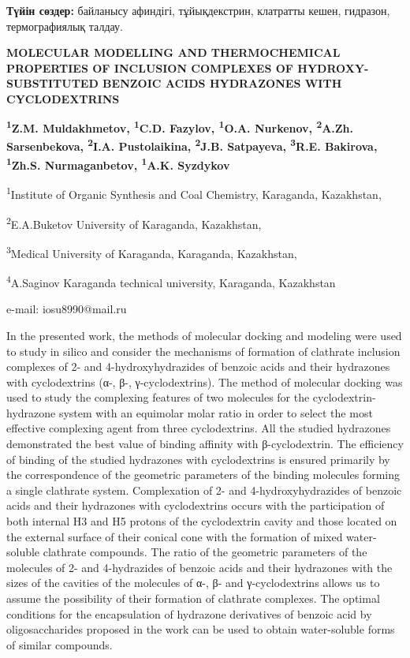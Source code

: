 {\bfseries Түйін сөздер:} байланысу афиндігі, тұйықдекстрин, клатратты
кешен, гидразон, термографиялық талдау.

\begin{articleheader}
{\bfseries MOLECULAR MODELLING AND THERMOCHEMICAL PROPERTIES OF INCLUSION COMPLEXES OF HYDROXY-SUBSTITUTED BENZOIC ACIDS HYDRAZONES WITH CYCLODEXTRINS}

{\bfseries
\textsuperscript{1}Z.M. Muldakhmetov,
\textsuperscript{1}C.D. Fazylov\textsuperscript{\envelope },
\textsuperscript{1}O.A. Nurkenov,
\textsuperscript{2}A.Zh. Sarsenbekova,
\textsuperscript{2}I.A. Pustolaikina,
\textsuperscript{2}J.B. Satpayeva,
\textsuperscript{3}R.E. Bakirova,
\textsuperscript{1}Zh.S. Nurmaganbetov,
\textsuperscript{1}A.K. Syzdykov
}
\end{articleheader}

\begin{affiliation}
\textsuperscript{1}Institute of Organic Synthesis and Coal Chemistry, Karaganda, Kazakhstan,

\textsuperscript{2}E.A.Buketov University of Karaganda, Kazakhstan,

\textsuperscript{3}Medical University of Karaganda, Karaganda, Kazakhstan,

\textsuperscript{4}A.Saginov Karaganda technical university, Karaganda, Kazakhstan

e-mail: iosu8990@mail.ru
\end{affiliation}

In the presented work, the methods of molecular docking and modeling
were used to study in silico and consider the mechanisms of formation of
clathrate inclusion complexes of 2- and 4-hydroxyhydrazides of benzoic
acids and their hydrazones with cyclodextrins (α-, β-, γ-cyclodextrins).
The method of molecular docking was used to study the complexing
features of two molecules for the cyclodextrin-hydrazone system with an
equimolar molar ratio in order to select the most effective complexing
agent from three cyclodextrins. All the studied hydrazones demonstrated
the best value of binding affinity with β-cyclodex\-trin. The efficiency
of binding of the studied hydrazones with cyclodextrins is ensured
primarily by the correspondence of the geometric parameters of the
binding molecules forming a single clathrate system. Complexation of 2-
and 4-hydroxyhydrazides of benzoic acids and their hydrazones with
cyclodextrins occurs with the participation of both internal H3 and H5
protons of the cyclodextrin cavity and those located on the external
surface of their conical cone with the formation of mixed water-soluble
clathrate compounds. The ratio of the geometric parameters of the
molecules of 2- and 4-hydrazides of benzoic acids and their hydrazones
with the sizes of the cavities of the molecules of α-, β- and
γ-cyclodextrins allows us to assume the possibility of their formation
of clathrate complexes. The optimal conditions for the encapsulation of
hydrazone derivatives of benzoic acid by oligosaccharides proposed in
the work can be used to obtain water-soluble forms of similar compounds.

